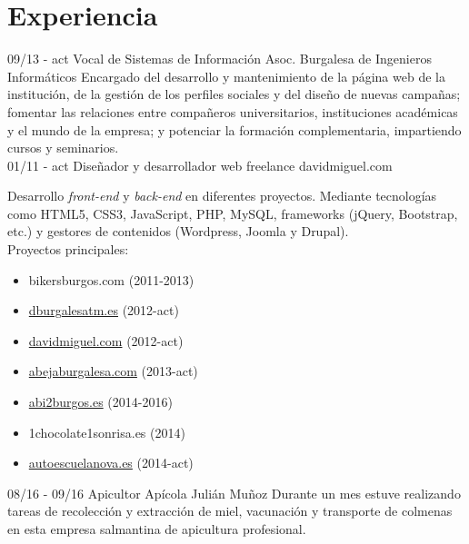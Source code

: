 \documentclass[]{friggeri-cv}
\begin{document}
\section{Experiencia}
\begin{entrylist}
    \entry
    {09/13 - act}
    {Vocal de Sistemas de Información}
    {Asoc. Burgalesa de Ingenieros Informáticos}
    {Encargado del desarrollo y mantenimiento de la página web de la institución, de la gestión de los perfiles sociales y del diseño de nuevas campañas; fomentar las relaciones entre compañeros universitarios, instituciones académicas y el mundo de la empresa; y potenciar la formación complementaria, impartiendo cursos y seminarios.\\}
  \entry
    {01/11 - act}
    {Diseñador y desarrollador web freelance}
    {davidmiguel.com}
    {Desarrollo \textit{front-end} y \textit{back-end} en diferentes proyectos. Mediante tecnologías como HTML5, CSS3, JavaScript, PHP, MySQL, frameworks (jQuery, Bootstrap, etc.) y gestores de contenidos (Wordpress, Joomla y Drupal).
    \\ [2mm]
    Proyectos principales:
    \begin{itemize}[noitemsep]
        \item bikersburgos.com (2011-2013)
        \item \href{http://www.dburgalesatm.es/}{dburgalesatm.es} (2012-act)
        \item \href{http://davidmiguel.com/}{davidmiguel.com} (2012-act)
        \item \href{http://www.abejaburgalesa.com/}{abejaburgalesa.com} (2013-act)
        \item \href{http://abi2burgos.es/}{abi2burgos.es} (2014-2016)
        \item 1chocolate1sonrisa.es (2014)
        \item \href{http://autoescuelanova.es/}{autoescuelanova.es} (2014-act)\\
    \end{itemize}    
    }
    \entry
    {08/16 - 09/16}
    {Apicultor}
    {Apícola Julián Muñoz}
    {Durante un mes estuve realizando tareas de recolección y extracción de miel, vacunación y transporte de colmenas en esta empresa salmantina de apicultura profesional.\\}
\end{entrylist}
\\
\end{document}
